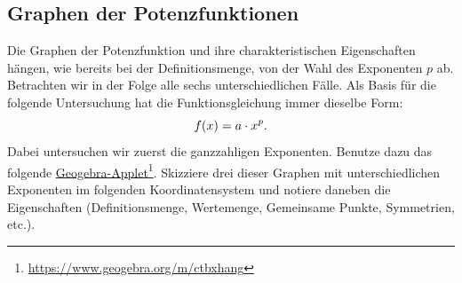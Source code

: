 \documentclass[11pt,oneside]{article}
\begin{document}
\subsection{Graphen der Potenzfunktionen}
	Die Graphen der Potenzfunktion und ihre charakteristischen Eigenschaften hängen, wie bereits bei der Definitionsmenge, von der Wahl des Exponenten $p$ ab. Betrachten wir in der Folge alle sechs unterschiedlichen Fälle. Als Basis für die folgende Untersuchung hat die Funktionsgleichung immer dieselbe Form: \[f(x)=a\cdot x^p.\] Dabei untersuchen wir zuerst die ganzzahligen Exponenten. Benutze dazu das folgende \href{https://www.geogebra.org/m/ctbxhang}{Geogebra-Applet}\footnote{\url{https://www.geogebra.org/m/ctbxhang}}. Skizziere drei dieser Graphen mit unterschiedlichen Exponenten im folgenden Koordinatensystem und notiere daneben die Eigenschaften (Definitionsmenge, Wertemenge, Gemeinsame Punkte, Symmetrien, etc.).\newpage
\end{document}
